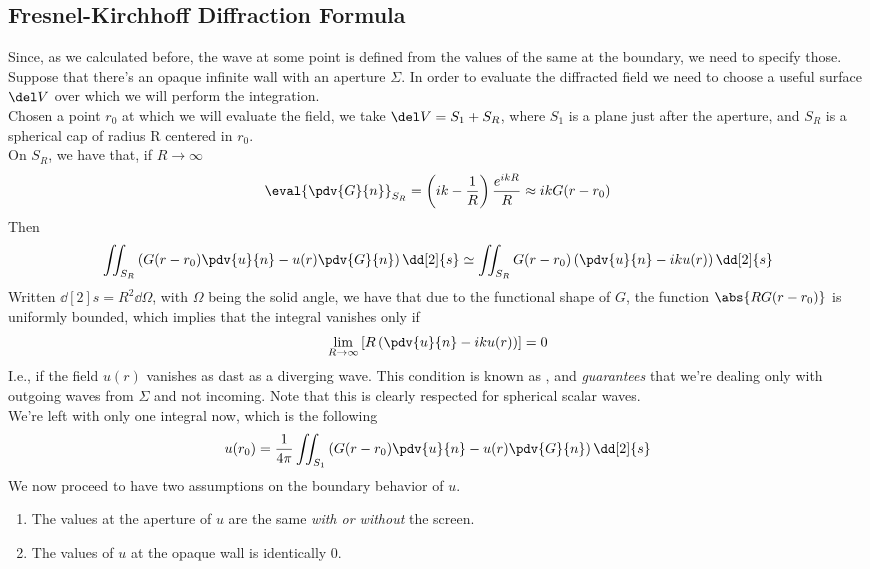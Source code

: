 \documentclass[../electromagnetism.tex]{subfiles}
\begin{document}
\subsection{Fresnel-Kirchhoff Diffraction Formula}
Since, as we calculated before, the wave at some point is defined from the values of the same at the boundary, we need to specify those.\\
Suppose that there's an opaque infinite wall with an aperture $\Sigma$. In order to evaluate the diffracted field we need to choose a useful surface $\del V$ over which we will perform the integration.\\
Chosen a point $r_0$ at which we will evaluate the field, we take $\del V=S_1+S_R$, where $S_1$ is a plane just after the aperture, and $S_R$ is a spherical cap of radius R centered in $r_0$.\\
On $S_R$, we have that, if $R\to\infty$
\begin{equation}
	\eval{\pdv{G}{n}}_{S_R}=\left( ik-\frac{1}{R} \right)\frac{e^{ikR}}{R}\approx ikG(r-r_0)
	\label{eq:greenapprox.kdiff}
\end{equation}
Then
\begin{equation*}
	\iint_{S_R}\left( G(r-r_0)\pdv{u}{n}-u(r)\pdv{G}{n} \right)\dd[2]{s}\simeq\iint_{S_R}G(r-r_0)\left( \pdv{u}{n}-iku(r) \right)\dd[2]{s}
\end{equation*}
Written $\dd[2]{s}=R^2\dd\Omega$, with $\Omega$ being the solid angle, we have that due to the functional shape of $G$, the function $\abs{RG(r-r_0)}$ is uniformly bounded, which implies that the integral vanishes only if 
\begin{equation}
	\lim_{R\to\infty}\left[ R\left( \pdv{u}{n}-iku(r) \right) \right]=0
	\label{eq:sommerfieldcon.diff}
\end{equation}
I.e., if the field $u(r)$ vanishes as dast as a diverging wave. This condition is known as , and \emph{guarantees} that we're dealing only with outgoing waves from $\Sigma$ and not incoming. Note that this is clearly respected for spherical scalar waves.\\
We're left with only one integral now, which is the following
\begin{equation}
	u(r_0)=\frac{1}{4\pi}\iint_{S_1}\left( G(r-r_0)\pdv{u}{n}-u(r)\pdv{G}{n} \right)\dd[2]{s}
	\label{eq:screenint.kdiff}
\end{equation}
We now proceed to have two assumptions on the boundary behavior of $u$. 
\begin{enumerate}
\item The values at the aperture of $u$ are the same \emph{with or without} the screen.
\item The values of $u$ at the opaque wall is identically $0$.
\end{enumerate}
\end{document}
